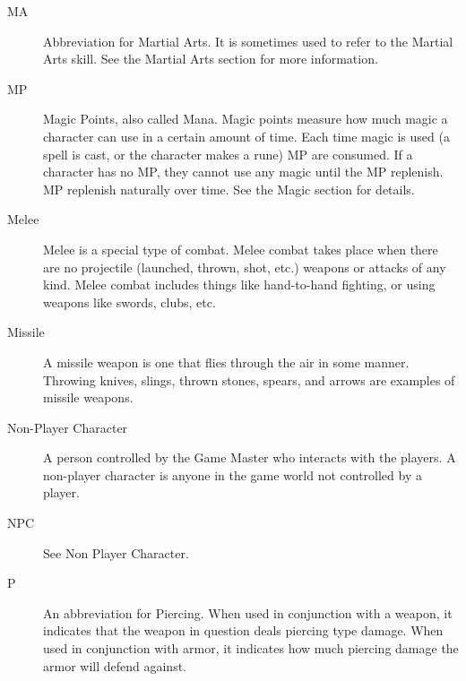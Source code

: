 \documentclass[twoside]{book}
\begin{document}
\begin{description}
{    }
  
  \item[ MA ] 
    {  
     Abbreviation for Martial Arts. It is sometimes
                 used to refer to the Martial Arts skill. See the Martial
                 Arts section for more information. 
    }
  
  \item[ MP ] 
    {  
     Magic Points, also called Mana. Magic points
                 measure how much magic a character can use in a certain
                 amount of time. Each time magic is used (a spell is
                 cast, or the character makes a rune) MP are consumed. If
                 a character has no MP, they cannot use any magic until
                 the MP replenish. MP replenish naturally over time. See
                 the Magic section for details. 
    }
  
  \item[ Melee ] 
    {  
     Melee is a special type of combat. Melee combat
                 takes place when there are no projectile (launched,
                 thrown, shot, etc.) weapons or attacks of any kind.
                 Melee combat includes things like hand-to-hand fighting,
                 or using weapons like swords, clubs, etc. 
    }
  
  \item[ Missile ] 
    {  
     A missile weapon is one that flies through the
                 air in some manner. Throwing knives, slings, thrown
                 stones, spears, and arrows are examples of missile
                 weapons. 
    }
  
  \item[ Non-Player Character ] 
    {  
     A person controlled by the Game Master who
                 interacts with the players. A non-player character is
                 anyone in the game world not controlled by a player.
                 
    }
  
  \item[ NPC ] 
    {  
     See Non Player Character. 
    }
  
  \item[ P ] 
    {  
     An abbreviation for Piercing. When used in
                 conjunction with a weapon, it indicates that the weapon
                 in question deals piercing type damage. When used in
                 conjunction with armor, it indicates how much piercing
                 damage the armor will defend against. 
    }
  

\end{description}
\end{document}
